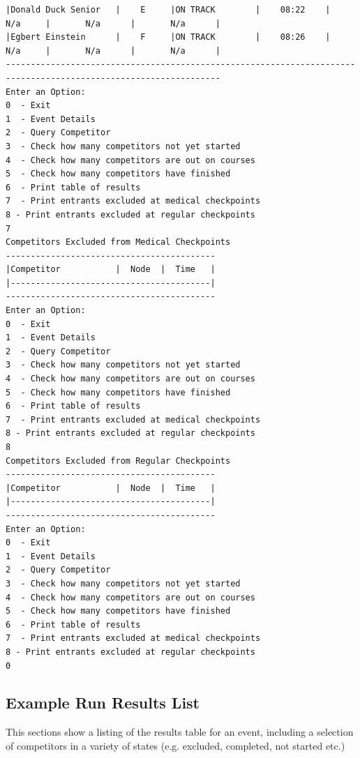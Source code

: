 \documentclass{article}
\begin{document}
\begin{center}
\begin{lstlisting}[showstringspaces=false, caption={Output of an example run of the C program}]
|Donald Duck Senior   |    E     |ON TRACK        |    08:22    |     N/a     |       N/a      |       N/a      |
|Egbert Einstein      |    F     |ON TRACK        |    08:26    |     N/a     |       N/a      |       N/a      |
-----------------------------------------------------------------------------------------------------------------
Enter an Option:
0  - Exit
1  - Event Details
2  - Query Competitor
3  - Check how many competitors not yet started
4  - Check how many competitors are out on courses
5  - Check how many competitors have finished
6  - Print table of results
7  - Print entrants excluded at medical checkpoints
8 - Print entrants excluded at regular checkpoints
7
Competitors Excluded from Medical Checkpoints
------------------------------------------
|Competitor           |  Node  |  Time   |
|----------------------------------------|
------------------------------------------
Enter an Option:
0  - Exit
1  - Event Details
2  - Query Competitor
3  - Check how many competitors not yet started
4  - Check how many competitors are out on courses
5  - Check how many competitors have finished
6  - Print table of results
7  - Print entrants excluded at medical checkpoints
8 - Print entrants excluded at regular checkpoints
8
Competitors Excluded from Regular Checkpoints
------------------------------------------
|Competitor           |  Node  |  Time   |
|----------------------------------------|
------------------------------------------
Enter an Option:
0  - Exit
1  - Event Details
2  - Query Competitor
3  - Check how many competitors not yet started
4  - Check how many competitors are out on courses
5  - Check how many competitors have finished
6  - Print table of results
7  - Print entrants excluded at medical checkpoints
8 - Print entrants excluded at regular checkpoints
0
	\end{lstlisting}
\end{center}

\subsection{Example Run Results List}
This sections show a listing of the results table for an event, including a selection of competitors in a variety of states (e.g. excluded, completed, not started etc.)
\end{document}

